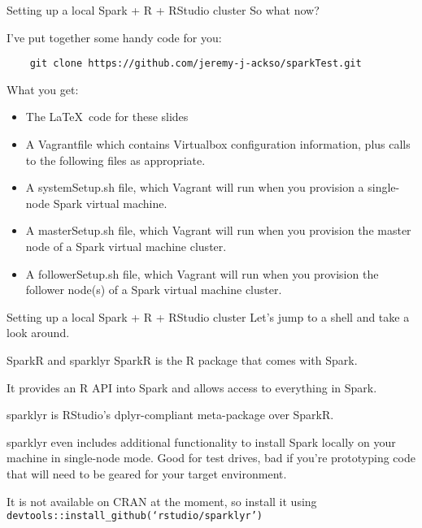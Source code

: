 \documentclass[pdf]{beamer}
\begin{document}
\begin{frame}[fragile]{Setting up a local Spark + R + RStudio cluster}
    So what now?

    I've put together some handy code for you:
    \begin{verbatim}
	git clone https://github.com/jeremy-j-ackso/sparkTest.git
    \end{verbatim}

    What you get:
    \begin{itemize}
	\item The \LaTeX\ code for these slides
	\item A Vagrantfile which contains Virtualbox configuration information, plus calls to the following files as appropriate.
	\item A systemSetup.sh file, which Vagrant will run when you provision a single-node Spark virtual machine.
	\item A masterSetup.sh file, which Vagrant will run when you provision the master node of a Spark virtual machine cluster.
	\item A followerSetup.sh file, which Vagrant will run when you provision the follower node(s) of a Spark virtual machine cluster.
    \end{itemize}
\end{frame}

\begin{frame}{Setting up a local Spark + R + RStudio cluster}
    Let's jump to a shell and take a look around.
\end{frame}

\begin{frame}{SparkR and sparklyr}
    SparkR is the R package that comes with Spark.

    It provides an R API into Spark and allows access to everything in Spark.

\vspace{20pt}

    sparklyr is RStudio's dplyr-compliant meta-package over SparkR.

    sparklyr even includes additional functionality to install Spark locally on your machine in single-node mode. Good for test drives, bad if you're prototyping code that will need to be geared for your target environment.

    It is not available on CRAN at the moment, so install it using \texttt{devtools::install\_github(`rstudio/sparklyr')}
\end{frame}
\end{document}
